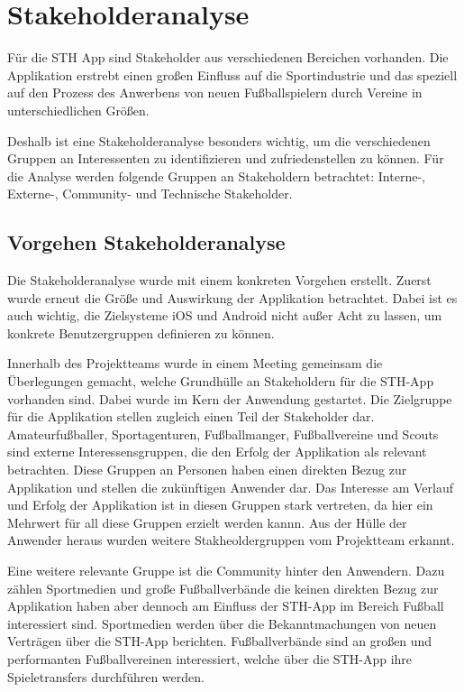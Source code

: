 \chapter{Stakeholderanalyse}

Für die STH App sind Stakeholder aus verschiedenen Bereichen vorhanden.
Die Applikation erstrebt einen großen Einfluss auf die Sportindustrie und das speziell auf den Prozess des Anwerbens von neuen Fußballspielern durch Vereine in unterschiedlichen Größen.

\noindent
Deshalb ist eine Stakeholderanalyse besonders wichtig, um die verschiedenen Gruppen an Interessenten zu identifizieren und zufriedenstellen zu können.
Für die Analyse werden folgende Gruppen an Stakeholdern betrachtet: Interne-, Externe-, Community- und Technische Stakeholder.

\section{Vorgehen Stakeholderanalyse}

Die Stakeholderanalyse wurde mit einem konkreten Vorgehen erstellt.
Zuerst wurde erneut die Größe und Auswirkung der Applikation betrachtet.
Dabei ist es auch wichtig, die Zielsysteme iOS und Android nicht außer Acht zu lassen, um konkrete Benutzergruppen definieren zu können.

\noindent
Innerhalb des Projektteams wurde in einem Meeting gemeinsam die Überlegungen gemacht, welche Grundhülle an Stakeholdern für die STH-App vorhanden sind.
Dabei wurde im Kern der Anwendung gestartet. Die Zielgruppe für die Applikation stellen zugleich einen Teil der Stakeholder dar.
Amateurfußballer, Sportagenturen, Fußballmanger, Fußballvereine und Scouts sind externe Interessensgruppen, die den Erfolg der Applikation als relevant betrachten.
Diese Gruppen an Personen haben einen direkten Bezug zur Applikation und stellen die zukünftigen Anwender dar.
Das Interesse am Verlauf und Erfolg der Applikation ist in diesen Gruppen stark vertreten, da hier ein Mehrwert für all diese Gruppen erzielt werden kannn.
Aus der Hülle der Anwender heraus wurden weitere Stakheoldergruppen vom Projektteam erkannt.

\noindent
Eine weitere relevante Gruppe ist die Community hinter den Anwendern.
Dazu zählen Sportmedien und große Fußballverbände die keinen direkten Bezug zur Applikation haben aber dennoch am Einfluss der STH-App im Bereich Fußball interessiert sind.
Sportmedien werden über die Bekanntmachungen von neuen Verträgen über die STH-App berichten.
Fußballverbände sind an großen und performanten Fußballvereinen interessiert, welche über die STH-App ihre Spieletransfers durchführen werden.

